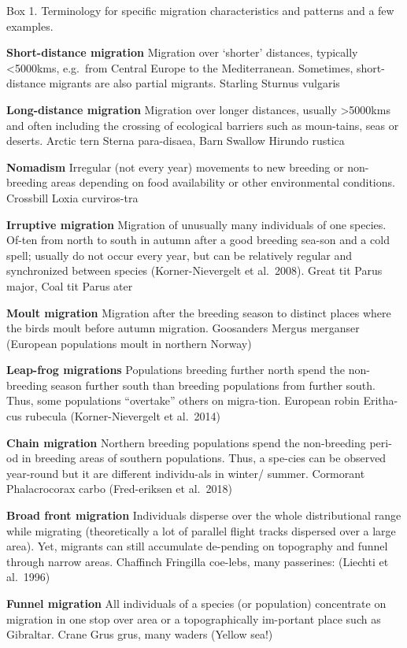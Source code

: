 \documentclass[
]{book}
\begin{document}
Box 1. Terminology for specific migration characteristics and patterns and a few examples.

\textbf{Short-distance migration} Migration over `shorter' distances, typically \textless5000kms, e.g.~from Central Europe to the Mediterranean. Sometimes, short-distance migrants are also partial migrants. Starling Sturnus vulgaris

\textbf{Long-distance migration} Migration over longer distances, usually \textgreater5000kms and often including the crossing of ecological barriers such as moun-tains, seas or deserts. Arctic tern Sterna para-disaea, Barn Swallow Hirundo rustica

\textbf{Nomadism} Irregular (not every year) movements to new breeding or non-breeding areas depending on food availability or other environmental conditions. Crossbill Loxia curviros-tra

\textbf{Irruptive migration} Migration of unusually many individuals of one species. Of-ten from north to south in autumn after a good breeding sea-son and a cold spell; usually do not occur every year, but can be relatively regular and synchronized between species (Korner-Nievergelt et al.~2008). Great tit Parus major, Coal tit Parus ater

\textbf{Moult migration} Migration after the breeding season to distinct places where the birds moult before autumn migration. Goosanders Mergus merganser (European populations moult in northern Norway)

\textbf{Leap-frog migrations} Populations breeding further north spend the non-breeding season further south than breeding populations from further south. Thus, some populations ``overtake'' others on migra-tion. European robin Eritha-cus rubecula (Korner-Nievergelt et al.~2014)

\textbf{Chain migration} Northern breeding populations spend the non-breeding peri-od in breeding areas of southern populations. Thus, a spe-cies can be observed year-round but it are different individu-als in winter/ summer. Cormorant Phalacrocorax carbo (Fred-eriksen et al.~2018)

\textbf{Broad front migration} Individuals disperse over the whole distributional range while migrating (theoretically a lot of parallel flight tracks dispersed over a large area). Yet, migrants can still accumulate de-pending on topography and funnel through narrow areas. Chaffinch Fringilla coe-lebs, many passerines: (Liechti et al.~1996)

\textbf{Funnel migration} All individuals of a species (or population) concentrate on migration in one stop over area or a topographically im-portant place such as Gibraltar. Crane Grus grus, many waders (Yellow sea!)
\end{document}
